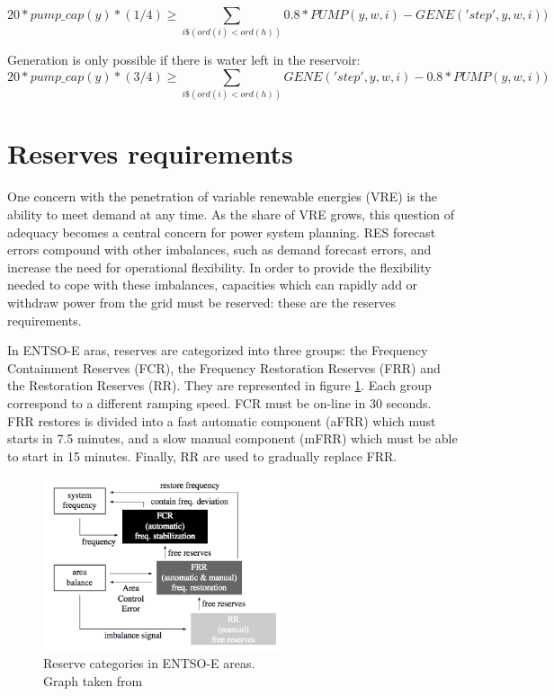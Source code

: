 \documentclass[authoryear]{elsarticle}
\begin{document}
\begin{equation}
20*pump\_cap(y)*(1/4) \geq \sum_{i\$(ord(i)<ord(h))} 0.8*PUMP(y,w,i)-GENE('step',y,w,i))
\end{equation}

Generation is only possible if there is water left in the reservoir:
\begin{equation}
20*pump\_cap(y)*(3/4) \geq \sum_{i\$(ord(i)<ord(h))} GENE('step',y,w,i)-0.8*PUMP(y,w,i))
\end{equation}



\section{Reserves requirements}

One concern with the penetration of variable renewable energies (VRE) is the ability to meet demand at any time. As the share of VRE grows, this question of adequacy becomes a central concern for power system planning. RES forecast errors compound with other imbalances, such as demand forecast errors, and increase the need for operational flexibility. In order to provide the flexibility needed to cope with these imbalances, capacities which can rapidly add or withdraw power from the grid must be reserved: these are the reserves requirements.

In ENTSO-E aras, reserves are categorized into three groups: the Frequency Containment Reserves (FCR), the Frequency Restoration Reserves (FRR) and the Restoration Reserves (RR). They are represented in figure \ref{fig:reservesCategories}. Each group correspond to a different ramping speed. FCR must be on-line in 30 seconds. FRR restores is divided into a fast automatic component (aFRR) which must starts in 7.5 minutes, and a slow manual component (mFRR) which must be able to start in 15 minutes. Finally, RR are used to gradually replace FRR. \citep{Stiphout2016}

\begin{figure}[!ht]
	\centering
	\includegraphics[width=7cm]{figures/reservesCategories.png}
	\caption{Reserve categories in ENTSO-E areas. \\ Graph taken from \citet{Stiphout2016}}
	\label{fig:reservesCategories}
\end{figure}
\end{document}
